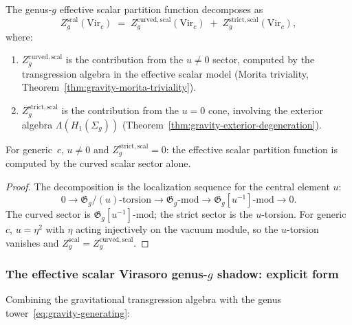 \begin{proposition}
\label{prop:gravity-u-eigenvalue}
The genus-$g$ effective scalar partition function decomposes as
\begin{equation}\label{eq:gravity-u-decomposition}
Z_g^{\mathrm{scal}}(\mathrm{Vir}_c)
\;=\;
Z_g^{\mathrm{curved,scal}}(\mathrm{Vir}_c)
\;+\;
Z_g^{\mathrm{strict,scal}}(\mathrm{Vir}_c),
\end{equation}
where:
\begin{enumerate}[label=\textup{(\roman*)}]
\item $Z_g^{\mathrm{curved,scal}}$ is the contribution from the
 $u \ne 0$ sector, computed by the transgression algebra
 in the effective scalar model
 \textup{(}Morita triviality,
 Theorem~\textup{\ref{thm:gravity-morita-triviality}}\textup{)}.
\item $Z_g^{\mathrm{strict,scal}}$ is the contribution from the
 $u = 0$ cone, involving the exterior algebra
 $\Lambda(H_1(\Sigma_g))$
 \textup{(}Theorem~\textup{\ref{thm:gravity-exterior-degeneration}}\textup{)}.
\end{enumerate}
For generic~$c$, $u \ne 0$ and
$Z_g^{\mathrm{strict,scal}} = 0$: the effective scalar partition
function is computed by the curved scalar sector alone.
\end{proposition}

\begin{proof}
The decomposition is the localization sequence for the
central element $u$:
\[
0 \to \mathfrak{G}_g/(u)\text{-torsion}
\to \mathfrak{G}_g\text{-mod}
\to \mathfrak{G}_g[u^{-1}]\text{-mod} \to 0.
\]
The curved sector is $\mathfrak{G}_g[u^{-1}]\text{-mod}$;
the strict sector is the $u$-torsion. For generic~$c$,
$u = \eta^2$ with $\eta$ acting injectively on the vacuum module,
so the $u$-torsion vanishes and
$Z_g^{\mathrm{scal}} = Z_g^{\mathrm{curved,scal}}$.
\end{proof}

\subsubsection*{The effective scalar Virasoro genus-$g$ shadow: explicit form}

Combining the gravitational transgression algebra with the genus
tower~\eqref{eq:gravity-generating}:

